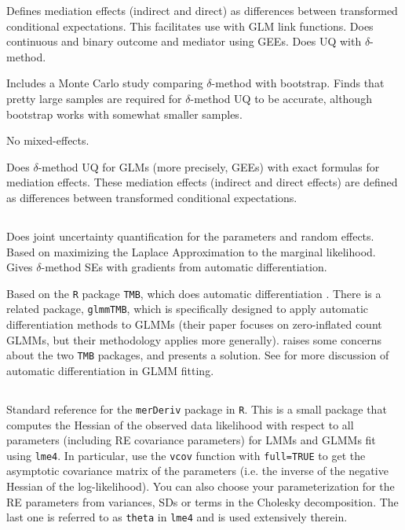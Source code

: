 \documentclass{article}
\begin{document}
Defines mediation effects (indirect and direct) as differences between transformed conditional expectations. This facilitates use with GLM link functions. Does continuous and binary outcome and mediator using GEEs. Does UQ with $\delta$-method. 

Includes a Monte Carlo study comparing $\delta$-method with bootstrap. Finds that pretty large samples are required for $\delta$-method UQ to be accurate, although bootstrap works with somewhat smaller samples.

No mixed-effects.

Does $\delta$-method UQ for GLMs (more precisely, GEEs) with exact formulas for mediation effects. These mediation effects (indirect and direct effects) are defined as differences between transformed conditional expectations. 


\subsection{\citet{Zhe21}}

Does joint uncertainty quantification for the parameters and random effects. Based on maximizing the Laplace Approximation to the marginal likelihood. Gives $\delta$-method SEs with gradients from automatic differentiation.

Based on the \texttt{R} package \texttt{TMB}, which does automatic differentiation \citep{Kri16}. There is a related package, \texttt{glmmTMB}, which is specifically designed to apply automatic differentiation methods to GLMMs \citep{Bro17} (their paper focuses on zero-inflated count GLMMs, but their methodology applies more generally). \citet{Zhe21} raises some concerns about the two \texttt{TMB} packages, and presents a solution. See \citet{Ska06} for more discussion of automatic differentiation in GLMM fitting.

\subsection{\citet{Wan18}}

Standard reference for the \texttt{merDeriv} package in \texttt{R}. This is a small package that computes the Hessian of the observed data likelihood with respect to all parameters (including RE covariance parameters) for LMMs and GLMMs fit using \texttt{lme4}. In particular, use the \texttt{vcov} function with \texttt{full=TRUE} to get the asymptotic covariance matrix of the parameters (i.e. the inverse of the negative Hessian of the log-likelihood). You can also choose your parameterization for the RE parameters from variances, SDs or terms in the Cholesky decomposition. The last one is referred to as \texttt{theta} in \texttt{lme4} and is used extensively therein.




\end{document}
